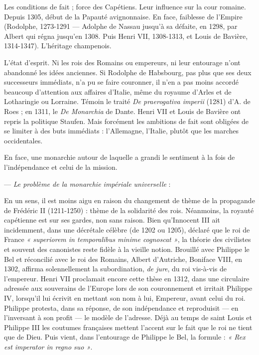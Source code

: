 \documentclass[french,twoside]{book} %
\def\bignobreak{\ifdim\lastskip<\bigskipamount
  \removelastskip\nopagebreak\bigskip\fi}
\newcommand{\labelblock}[1]{\bigbreak{\color{rubric}\noindent\textbf{#1}\par}\bignobreak}
\begin{document}
\labelblock{— {\itshape Deuxième période} : l’expansion française dans l’Empire.}

\noindent Les conditions de fait ; force des Capétiens. Leur influence sur la cour romaine. Depuis 1305, début de la Papauté avignonnaise.  
\label{p32} En face, faiblesse de l’Empire (Rodolphe, 1273-1291 — Adolphe de Nassau jusqu’à sa défaite, en 1298, par Albert qui régna jusqu’en 1308. Puis Henri VII, 1308-1313, et Louis de Bavière, 1314-1347). L’héritage champenois.\par
L’état d’esprit. Ni les rois des Romains ou empereurs, ni leur entourage n’ont abandonné les idées anciennes. Si Rodolphe de Habsbourg, pas plus que ses deux successeurs immédiats, n’a pu se faire couronner, il n’en a pas moins accordé beaucoup d’attention aux affaires d’Italie, même du royaume d’Arles et de Lotharingie ou Lorraine. Témoin le traité {\itshape De praerogativa imperii} (1281) d’A. de Roes ; en 1311, le {\itshape De Monarchia} de Dante. Henri VII et Louis de Bavière ont repris la politique Staufen. Mais forcément les ambitions de fait sont obligées de se limiter à des buts immédiats : l’Allemagne, l’Italie, plutôt que les marches occidentales.\par
En face, une monarchie autour de laquelle a grandi le sentiment à la fois de l’indépendance et celui de la mission.\par
— {\itshape Le problème de la monarchie impériale universelle} :\par
En un sens, il est moins aigu en raison du changement de thème de la propagande de Frédéric II (1211-1250) : thème de la solidarité des rois. Néanmoins, la royauté capétienne est sur ses gardes, non sans raison. Bien qu’Innocent III ait incidemment, dans une décrétale célèbre (de 1202 ou 1205), déclaré que le roi de France \emph{« superiorem in temporalibus minime cognoscat »}, la théorie des civilistes et souvent des canonistes reste fidèle à la vieille notion. Brouillé avec Philippe le Bel et réconcilié avec le roi des Romains, Albert d’Autriche, Boniface VIII, en 1302, affirma solennellement la subordination, {\itshape de jure}, du roi vis-à-vis de l’empereur. Henri VII proclamait encore cette thèse en 1312, dans une circulaire adressée aux souverains de l’Europe lors de son couronnement et irritait Philippe IV, lorsqu’il lui écrivit en mettant son nom à lui, Empereur, avant celui du roi. Philippe protesta, dans sa réponse, de son indépendance et reproduisit — en l’inversant à son profit — le modèle de l’adresse. Déjà au temps de saint Louis et Philippe III les coutumes françaises mettent l’accent sur le fait que le roi ne tient que de Dieu. Puis vient, dans l’entourage de Philippe le Bel, la formule : \emph{« Rex est imperator in regno suo »}.\par
\end{document}
